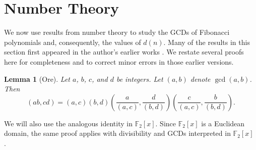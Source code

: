 \documentclass[a4paper]{article}
\newtheorem{lemma}[theorem]{Lemma}
\newcommand{\F}{\mathbb{F}}
\begin{document}
	\section{Number Theory}
	We now use results from number theory to study the GCDs of Fibonacci polynomials and, consequently, the values of $d(n)$.
	Many of the results in this section first appeared in the author's earlier works \cite{boylesMostClicks, boylesResolutionSutner}.
	We restate several proofs here for completeness and to correct minor errors in those earlier versions.
	
	\begin{lemma}[Ore]\label{OreGcd}
		Let $a$, $b$, $c$, and $d$ be integers.
		Let $(a,b)$ denote $\gcd{(a,b)}$.
		Then
		\begin{equation*}
			(ab,cd) = (a,c)(b,d)\left(\frac{a}{(a,c)},\frac{d}{(b,d)}\right)\left(\frac{c}{(a,c)},\frac{b}{(b,d)}\right).
		\end{equation*}
	\end{lemma}
	We will also use the analogous identity in $\F_2[x]$.
	Since $\F_2[x]$ is a Euclidean domain, the same proof applies with divisibility and GCDs interpreted in $\F_2[x]$ \cite[Section 5-4, Problem 2, p.~109]{ore_number_theory}.
	
\end{document}
